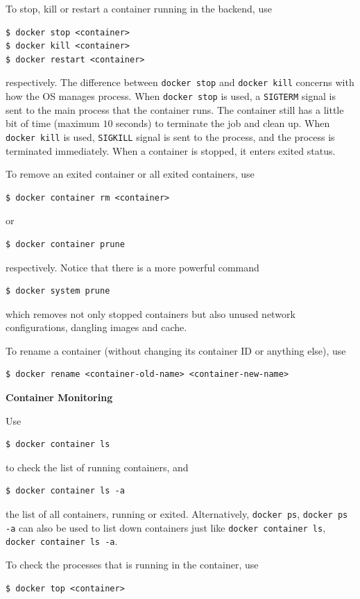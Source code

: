To stop, kill or restart a container running in the backend, use
\begin{lstlisting}
$ docker stop <container>
$ docker kill <container>
$ docker restart <container>
\end{lstlisting}
respectively. The difference between \verb|docker stop| and \verb|docker kill| concerns with how the OS manages process. When \verb|docker stop| is used, a  \verb|SIGTERM| signal is sent to the main process that the container runs. The container still has a little bit of time (maximum $10$ seconds) to terminate the job and clean up. When \verb|docker kill| is used, \verb|SIGKILL| signal is sent to the process, and the process is terminated immediately. When a container is stopped, it enters exited status.

To remove an exited container or all exited containers, use
\begin{lstlisting}
$ docker container rm <container>
\end{lstlisting}
or
\begin{lstlisting}
$ docker container prune
\end{lstlisting}
respectively. Notice that there is a more powerful command
\begin{lstlisting}
$ docker system prune
\end{lstlisting}
which removes not only stopped containers but also unused network configurations, dangling images and cache.

To rename a container (without changing its container ID or anything else), use
\begin{lstlisting}
$ docker rename <container-old-name> <container-new-name>
\end{lstlisting}

\vspace{0.1in}
\noindent \textbf{Container Monitoring}
\vspace{0.1in}

Use
\begin{lstlisting}
$ docker container ls
\end{lstlisting}
to check the list of running containers, and
\begin{lstlisting}
$ docker container ls -a
\end{lstlisting}
the list of all containers, running or exited. Alternatively, \verb|docker ps|, \verb|docker ps -a| can also be used to list down containers just like \verb|docker container ls|, \verb|docker container ls -a|.

To check the processes that is running in the container, use
\begin{lstlisting}
$ docker top <container>
\end{lstlisting}

